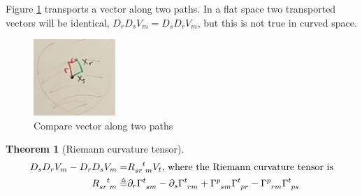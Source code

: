 \documentclass[]{article}
\newtheorem{thm}{Theorem}
\begin{document}
Figure \ref{fig:gr-4-2D} transports a vector along two paths. In a flat space two transported vectors will be identical, $D_r D_s V_m = D_s D_r V_m$, but this is not true in curved space.
\begin{figure}[H]
	\begin{center}
		\caption{Compare vector along two paths}\label{fig:gr-4-2D}
		\includegraphics{gr-4-2D}
	\end{center}
\end{figure}

\begin{thm}[Riemann curvature tensor]
	\begin{align*}
		D_s D_r V_m - D_r D_s V_m =& R\indices{_{sr}^t_m} V_t \text{, where the Riemann curvature tensor is}\\
		R\indices{_{sr}^t_m} \triangleq & \partial_r \Gamma \indices{^t_{sm}} - \partial_s \Gamma \indices{^t_{rm}} + \Gamma \indices{^p_{sm}} \Gamma \indices{^t_{pr}}- \Gamma \indices{^p_{rm}} \Gamma \indices{^t_{ps}} 
	\end{align*}
\end{thm}
\end{document}
